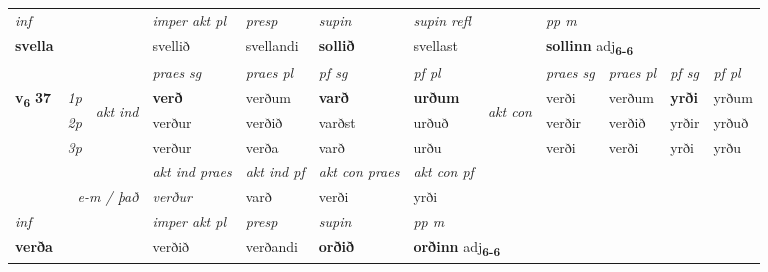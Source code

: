 \begin{longtable}[l]{X>{\footnotesize\itshape}llXXXXlXXXX}
   {\textit{inf}} & &  & \textit{imper akt pl}   & \textit{presp} & \textit{supin} & \textit{supin refl} && \textit{pp m} \\*
  {\textbf{svella}} & &  & svellið   & svellandi &  \textbf{sollið} & svellast && \multicolumn{2}{l}{\textbf{sollinn} adj\textbf{\textsubscript{6-6}}} \\*

\midrule

 & &   & \textit{praes sg}  & \textit{praes pl}    & \textit{ pf sg} & \textit{pf pl} & & \textit{praes sg}  & \textit{praes pl}    & \textit{pf sg} & \textit{pf pl }  \\ \cmidrule{4-7} \cmidrule{9-12}
 \multirow{2}{*}{{{\textbf{v{\textsubscript{6}}} \Large{\textbf{37}}}}}  & 1p & \multirow{3}{*}{\begin{turn}{90}\textit{akt ind}\end{turn}} & \textbf{verð} & verðum & \textbf{varð} & \textbf{urðum} & \multirow{3}{*}{\begin{turn}{90}\textit{akt con}\end{turn}} &verði & verðum & \textbf{yrði} & yrðum\\*
 & 2p &  &  verður  & verðið & varðst & urðuð & & verðir & verðið & yrðir & yrðuð \\*
 & 3p &  & verður & verða & varð & urðu & & verði & verði& yrði & yrðu \\*
\cmidrule{4-7} \cmidrule{9-12}

   && &  \textit{akt ind praes} & \textit{akt ind pf} & \textit{akt con praes} & \textit{akt con pf} \\*
\multicolumn{3}{r}{\textit{e-m / það}} & verður & varð & verði & yrði \\*

\cmidrule{4-7}
   {\textit{inf}} & &  & \textit{imper akt pl}   & \textit{presp} & \textit{supin}  & \textit{pp m} \\*
  {\textbf{verða}} & &  & verðið   & verðandi &  \textbf{orðið}  & \multicolumn{2}{l}{\textbf{orðinn} adj\textbf{\textsubscript{6-6}}} \\*

\midrule


\end{longtable}
